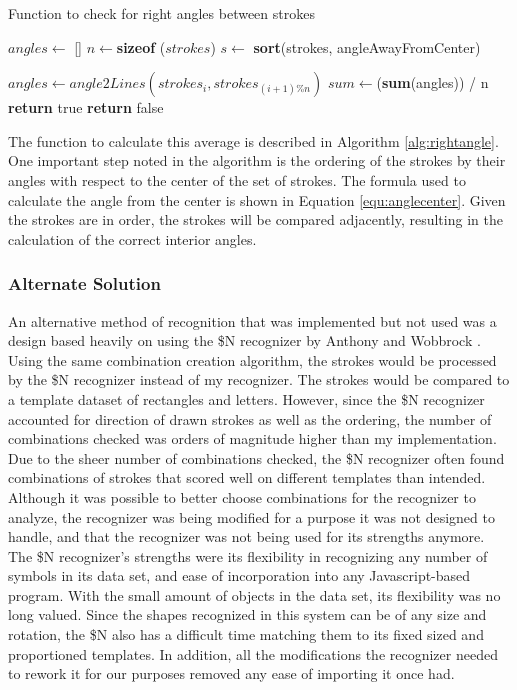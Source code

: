 \begin{algorithm}
\caption[Function to check for right angle between strokes]{Function to check for right angles between strokes}
\label{alg:rightangle}
\begin{algorithmic}[1]
\State $angles \gets $ []
\State $n \gets $\textbf{sizeof} ($strokes$)
\State $s \gets $ \textbf{sort}(strokes, angleAwayFromCenter)

    \State $angles \gets  angle2Lines(strokes_i, strokes_{(i+1)\%n})$
\EndFor
\State $sum \gets $(\textbf{sum}(angles)) / n
        \State \textbf{return} true
    \EndIf
\State \textbf{return} false

\EndFunction
\end{algorithmic}
\end{algorithm}

The function to calculate this average is described in Algorithm \ref{alg:rightangle}. One important step noted in the algorithm is the ordering of the strokes by their angles with respect to the center of the set of strokes. The formula used to calculate the angle from the center is shown in Equation \ref{equ:anglecenter}. Given the strokes are in order, the strokes will be compared adjacently, resulting in the calculation of the correct interior angles.

\subsubsection{Alternate Solution}

An alternative method of recognition that was implemented but not used was a design based heavily on using the \$N recognizer by Anthony and Wobbrock \cite{dollarN}. Using the same combination creation algorithm, the strokes would be processed by the \$N recognizer instead of my recognizer. The strokes would be compared to a template dataset of rectangles and letters. However, since the \$N recognizer accounted for direction of drawn strokes as well as the ordering, the number of combinations checked was orders of magnitude higher than my implementation. Due to the sheer number of combinations checked, the \$N recognizer often found combinations of strokes that scored well on different templates than intended. Although it was possible to better choose combinations for the recognizer to analyze, the recognizer was being modified for a purpose it was not designed to handle, and that the recognizer was not being used for its strengths anymore. The \$N recognizer's strengths were its flexibility in recognizing any number of symbols in its data set, and ease of incorporation into any Javascript-based program. With the small amount of objects in the data set, its flexibility was no long valued. Since the shapes recognized in this system can be of any size and rotation, the \$N also has a difficult time matching them to its fixed sized and proportioned templates. In addition, all the modifications the recognizer needed to rework it for our purposes removed any ease of importing it once had.

